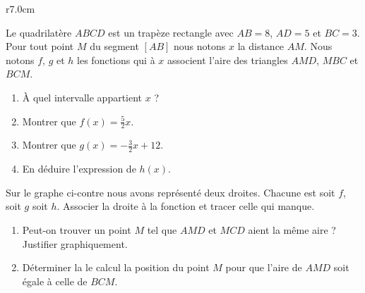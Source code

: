 
\begin{exercice}\label{exosmath-0552}

\begin{wrapfigure}{r}{7.0cm}
   \vspace{-0.5cm}        %
   \centering
   

   
\end{wrapfigure}

    Le quadrilatère \( ABCD\) est un trapèze rectangle avec \( AB=8\), \( AD=5\) et \( BC=3\). Pour tout point \( M\) du segment \( [AB]\) nous notons \( x\) la distance \( AM\). Nous notons \( f\), \( g\) et \( h\) les fonctions qui à \( x\) associent l'aire des triangles \( AMD\), \( MBC\) et \( BCM\).
    \begin{enumerate}
        \item
            À quel intervalle appartient \( x\) ?
        \item
            Montrer que \( f(x)=\frac{ 5 }{2}x\).
        \item
            Montrer que \( g(x)=-\frac{ 3 }{2}x+12\).
        \item
            En déduire l'expression de \( h(x)\).
    \end{enumerate}
    Sur le graphe ci-contre nous avons représenté deux droites. Chacune est soit \( f\), soit \( g\) soit \( h\). Associer la droite à la fonction et tracer celle qui manque.

    \begin{enumerate}
        \item
            Peut-on trouver un point \( M\) tel que \( AMD\) et \( MCD\) aient la même aire ? Justifier graphiquement.
        \item
            Déterminer la le calcul la position du point \( M\) pour que l'aire de \( AMD\) soit égale à celle de \( BCM\).
    \end{enumerate}

\end{exercice}
